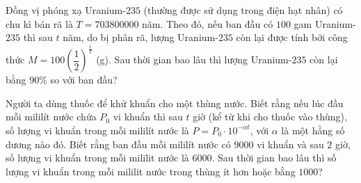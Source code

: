 \begin{vd}%
	Đồng vị phóng xạ Uranium-$235$ (thường được sử dụng trong điện hạt nhân) có chu kì bán rã là $T=703800000$ năm. Theo đó, nếu ban đầu có $100$ gam Uranium-$235$ thì sau $t$ năm, do bị phân rã, lượng Uranium-$235$ còn lại được tính bởi công thức $M=100\left(\dfrac{1}{2}\right)^{\frac{t}{T}}$ (g). Sau thời gian bao lâu thì lượng Uranium-$235$ còn lại bằng $90 \%$ so với ban đầu?
\end{vd} 

\begin{vd}%
	Người ta dùng thuốc để khử khuẩn cho một thùng nước. Biết rằng nếu lúc đầu mỗi mililít nước chứa $P_{0}$ vi khuẩn thì sau $t$ giờ (kể từ khi cho thuốc vào thùng), số lượng vi khuẩn trong mỗi mililít nước là $P=P_0 \cdot 10^{-\alpha t}$, với $\alpha$ là một hằng số dương nào đó. Biết rằng ban đầu mỗi mililít nước có $9000$ vi khuẩn và sau $2$ giờ, số lượng vi khuẩn trong mỗi mililit nước là $6000$. Sau thời gian bao lâu thì số lượng vi khuẩn trong mỗi mililit nước trong thùng ít hơn hoặc bằng $1000$?
\end{vd} 

